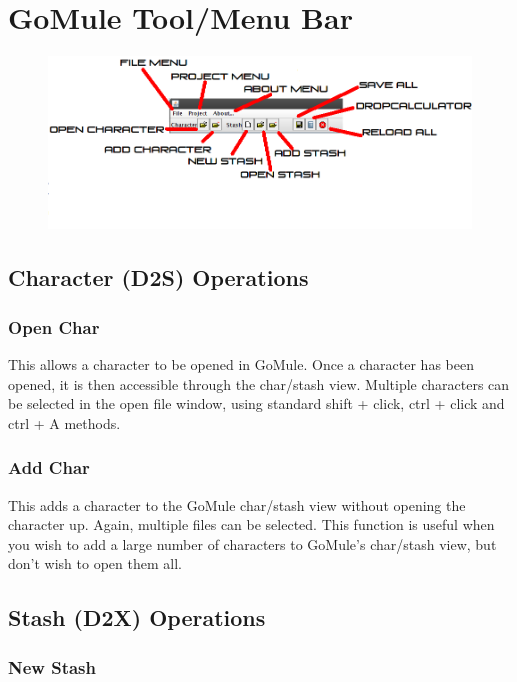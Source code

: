 \documentclass[a4paper,10pt]{article}
\begin{document}
\section{GoMule Tool/Menu Bar}

\begin{figure}[htp]
\centering
 \includegraphics[width=140mm]{baseGUITop.png}
\end{figure}

\subsection{Character (D2S) Operations}

\subsubsection{Open Char}

This allows a character to be opened in GoMule. Once a character has been opened, it is then accessible through the char/stash view. Multiple characters can be selected in the open file window, using standard shift + click, ctrl + click and ctrl + A methods.

\subsubsection{Add Char}

This adds a character to the GoMule char/stash view without opening the character up. Again, multiple files can be selected. This function is useful when you wish to add a large number of characters to GoMule's char/stash view, but don't wish to open them all. 

\subsection{Stash (D2X) Operations}

\subsubsection{New Stash}
\end{document}
